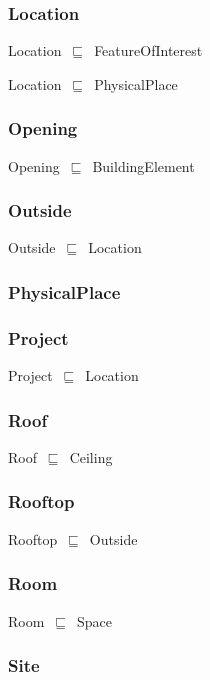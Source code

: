 \documentclass{article}
\begin{document}
\subsubsection*{Location}

Location~\ensuremath{\sqsubseteq}~FeatureOfInterest~

Location~\ensuremath{\sqsubseteq}~PhysicalPlace~

\subsubsection*{Opening}

Opening~\ensuremath{\sqsubseteq}~BuildingElement~

\subsubsection*{Outside}

Outside~\ensuremath{\sqsubseteq}~Location~

\subsubsection*{PhysicalPlace}

\subsubsection*{Project}

Project~\ensuremath{\sqsubseteq}~Location~

\subsubsection*{Roof}

Roof~\ensuremath{\sqsubseteq}~Ceiling~

\subsubsection*{Rooftop}

Rooftop~\ensuremath{\sqsubseteq}~Outside~

\subsubsection*{Room}

Room~\ensuremath{\sqsubseteq}~Space~

\subsubsection*{Site}
\end{document}
